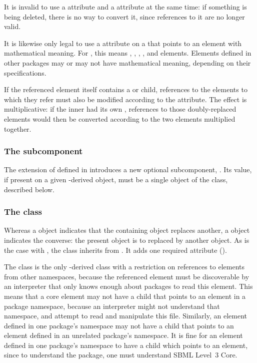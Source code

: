 It is invalid to use a  attribute and a
 attribute at the same time: if something is being
deleted, there is no way to convert it, since references to it are no
longer valid.

It is likewise only legal to use a  attribute on
a \ReplacedElement that points to an element with mathematical meaning.
For \sbmlthreecore, this means \Compartment, \Parameter, \Reaction,
\Species, and \SpeciesReference elements.  Elements defined in other
packages may or may not have mathematical meaning, depending on their
specifications.

If the referenced element itself contains a \ReplacedElement or \ReplacedBy child,
references to the elements to which they refer must also be modified according
to the  attribute.  The effect is multiplicative:
if the inner \ReplacedElement had its own , references
to those doubly-replaced elements would then be converted according to the
two  elements multiplied together.

\subsubsection{The \fixttspace{} subcomponent}

The extension of \SBase defined in  introduces a
new optional subcomponent, .  Its value, if present on
a given \SBase-derived object, must be a single object of the
\ReplacedBy class, described below.


\subsubsection{The  class}
\label{replacedby-class}

Whereas a \ReplacedElement object indicates that the containing object
replaces another, a \ReplacedBy object indicates the converse: the
present object is to replaced by another object.  As is the case with
\ReplacedElement, the \ReplacedBy class inherits from \SBaseRef.  It
adds one required attribute ().

The \ReplacedBy class is the only \SBaseRef-derived class with a
restriction on references to elements from other namespaces, because the
referenced element must be discoverable by an interpreter that only
knows enough about packages to read this element.  This means that a
core element may not have a \ReplacedBy child that points to an element
in a package namespace, because an interpreter might not understand that
namespace, and attempt to read and manipulate this file.  Similarly, an
element defined in one package's namespace may not have a \ReplacedBy
child that points to an element defined in an unrelated package's
namespace.  It is fine for an element defined in one package's namespace
to have a \ReplacedBy child which points to an \sbmlthreecore element,
since to understand the package, one must understand SBML Level~3 Core.

